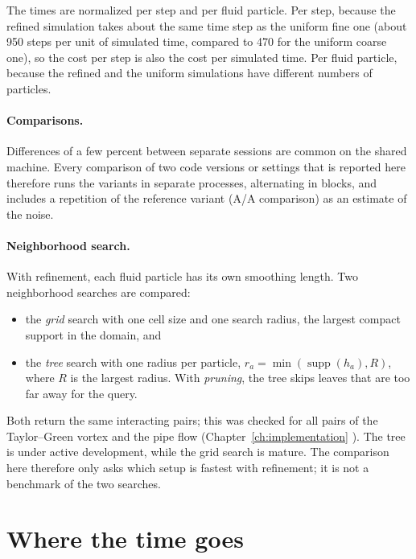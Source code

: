 The times are normalized per step and per fluid particle. Per step, because the refined
simulation takes about the same time step as the uniform fine one (about 950 steps per
unit of simulated time, compared to 470 for the uniform coarse one), so the cost per step is
also the cost per simulated time. Per fluid particle, because the refined and the
uniform simulations have different numbers of particles.

\paragraph{Comparisons.}
Differences of a few percent between separate sessions are common on the shared machine.
Every comparison of two code versions or settings that is reported here therefore runs the
variants in separate processes, alternating in blocks, and includes a repetition of the
reference variant (A/A comparison) as an estimate of the noise.

\paragraph{Neighborhood search.}
With refinement, each fluid particle has its own smoothing length. Two neighborhood searches
are compared:
\begin{itemize}
  \item the \emph{grid} search with one cell size and one search radius, the largest
        compact support in the domain, and
  \item the \emph{tree} search with one radius per particle, $r_a =
        \min(\operatorname{supp}(h_a), R)$, where $R$ is the largest radius. With
        \emph{pruning}, the tree skips leaves that are too far away for the query.
\end{itemize}
Both return the same interacting pairs; this was checked for all pairs of the
Taylor--Green vortex and the pipe flow (Chapter~\ref{ch:implementation}
). The tree is under active development, while the grid search is
mature. The comparison here therefore only asks which setup is fastest with refinement; it
is not a benchmark of the two searches.

\section{Where the time goes}
\label{sec:performance-budget}

